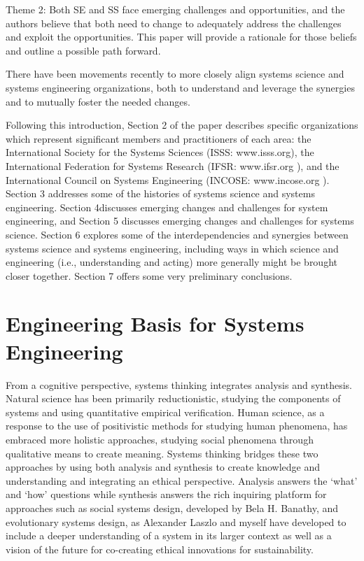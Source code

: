 Theme 2: Both SE and SS face emerging challenges and opportunities, and the authors believe that both need to change to adequately address the challenges and exploit the opportunities. This paper will provide a rationale for those beliefs and outline a possible path forward.

There have been movements recently to more closely align systems science and systems engineering organizations, both to understand and leverage the synergies and to mutually foster the needed changes.

Following this introduction, Section 2 of the paper describes specific organizations which represent significant members and practitioners of each area: the International Society for the Systems Sciences (ISSS: www.isss.org), the International Federation for Systems Research (IFSR: www.ifsr.org ), and the International Council on Systems Engineering (INCOSE: www.incose.org ). Section 3 addresses some of the histories of systems science and systems engineering. Section 4discusses emerging changes and challenges for system engineering, and Section 5 discusses emerging changes and challenges for systems science. Section 6 explores some of the interdependencies and synergies between systems science and systems engineering, including ways in which science and engineering (i.e., understanding and acting) more generally might be brought closer together. Section 7 offers some very preliminary conclusions.


\section{Engineering Basis for Systems Engineering}

From a cognitive perspective, systems thinking integrates analysis and synthesis. Natural science has been primarily reductionistic, studying the components of systems and using quantitative empirical verification. Human science, as a response to the use of positivistic methods for studying human phenomena, has embraced more holistic approaches, studying social phenomena through qualitative means to create meaning. Systems thinking bridges these two approaches by using both analysis and synthesis to create knowledge and understanding and integrating an ethical perspective. Analysis answers the `what’ and `how’ questions while synthesis answers the rich inquiring platform for approaches such as social systems design, developed by Bela H. Banathy, and evolutionary systems design, as Alexander Laszlo and myself have developed to include a deeper understanding of a system in its larger context as well as a vision of the future for co-creating ethical innovations for sustainability.

